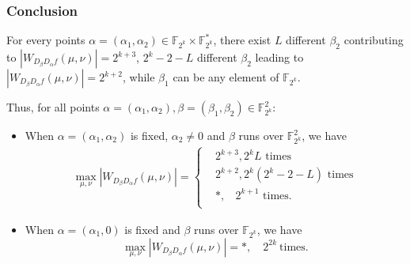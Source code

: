 \documentclass[
    aspectratio=169,                   %
]{beamer}
\newcommand{\Fks}{\mathbb{F}_{2^k}^*}
\newcommand{\Fk}{\mathbb{F}_{2^k}}
\begin{document}
    \begin{frame}
        \frametitle{Conclusion}
    
        For every points $ \alpha=(\alpha_1,\alpha_2)\in\Fk\times\Fks $, there exist $ L $ different $ \beta_2 $ 
        contributing to $ |W_{D_{\beta}D_{\alpha}f}(\mu,\nu)| = 2^{k+3} $, $ 2^k-2-L $ different $ \beta_2 $ leading 
        to  $ |W_{D_{\beta}D_{\alpha}f}(\mu,\nu)| = 2^{k+2} $, while $ \beta_1 $ can be any element of $ \Fk $. 

        Thus, for all points $ \alpha=(\alpha_1,\alpha_2),\beta=(\beta_1,\beta_2)\in\Fk^2 $:
        \begin{itemize}
            \item When $ \alpha=(\alpha_1,\alpha_2) $ is fixed, $ \alpha_2\ne 0 $ and $ \beta $ runs over $ \Fk^2 $, we have 
        \begin{align*}
            \max_{\mu,\nu}|W_{D_{\beta}D_{\alpha}f}(\mu,\nu)|=
            \begin{cases}
                &2^{k+3},2^kL\text{~times}\\
                &2^{k+2},2^k(2^k-2-L)\text{~times}\\
                &*,~~~~2^{k+1}\text{~times}.\\
            \end{cases}
        \end{align*}
        \item  When $ \alpha=(\alpha_1,0) $ is fixed and $ \beta $ runs over $ \Fk $, we have
        \[\max_{\mu,\nu}|W_{D_{\beta}D_{\alpha}f}(\mu,\nu)|=*,\quad 2^{2k}~\text{times}.\]
    \end{itemize}
    
    \end{frame}

    \makebottom     %
\end{document}
